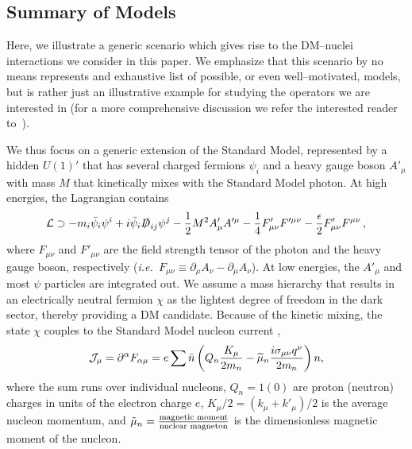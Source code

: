 \documentclass[11pt, a4paper]{article}
\newcommand{\ie}{{\it i.e.~}}  \newcommand{\eg}{{\it e.g.~}}
\newcommand{\pL}{\left(} \newcommand{\pR}{\right)} \newcommand{\bL}{\left[} \newcommand{\bR}{\right]} \newcommand{\cbL}{\left\{} \newcommand{\cbR}{\right\}} \newcommand{\mL}{\left|} \newcommand{\mR}{\right|} \newcommand{\ER}{E_R}
\newcommand{\beq}{\begin{equation}} \newcommand{\eeq}{\end{equation}}
\begin{document}
 
\subsection{Summary of Models}\label{sec:models}

Here, we illustrate a generic scenario which gives rise to the DM--nuclei interactions we consider in this paper. We emphasize that this scenario by no means represents and exhaustive list of possible, or even well--motivated, models, but is rather just an illustrative example for studying the operators we are interested in (for a more comprehensive discussion we refer the interested reader to~\cite{Gresham:2014vja,Gluscevic:2015sqa}). 

We thus focus on a generic extension of the Standard Model, represented by a hidden $U(1)'$ that has several charged fermions $\psi_i$ and a heavy gauge boson $A'_\mu$ with mass $M$ that kinetically mixes with the Standard Model photon. At high energies, the Lagrangian contains
\beq \label{eq:UV-model}
\cL \supset -  m_i \bar{\psi}_i \psi^i + i \bar \psi_i \slashed D_{ij} \psi^j  - \frac12 M^2 A'_\mu A'^\mu  - \frac14 F'_{\mu \nu} F'^{\mu \nu} - \frac\epsilon2 F'_{\mu \nu} F^{\mu \nu} \, ,
\eeq
where $F_{\mu \nu}$ and $F'_{\mu \nu}$ are the field strength tensor of the photon and the heavy gauge boson, respectively (\ie $F_{\mu \nu} \equiv \partial_\mu A_\nu - \partial_\mu A_\nu$). At low energies, the $A'_\mu$ and most $\psi$ particles are integrated out. We assume a mass hierarchy that results in an electrically neutral fermion $\chi$ as the lightest degree of freedom in the dark sector, thereby providing a DM candidate. Because of the kinetic mixing, the state $\chi$ couples to the Standard Model nucleon current \cite{Gresham:2014vja},
\beq \label{eq:current}
\cJ_\mu = \partial^\alpha F_{\alpha \mu} = e \sum \bar n \pL Q_{n} \frac{K_\mu}{2m_{n}} -\widetilde \mu_{n} \frac{i \sigma_{\mu \nu}q^\nu}{2m_n} \pR n,
\eeq 
where the sum runs over individual nucleons, $Q_n=1(0)$ are proton (neutron) charges in units of the electron charge $e$, $K_\mu/2 = (k_\mu + k'_\mu)/2$ is the average nucleon momentum, and $\tilde{\mu}_n = {\text{magnetic moment} \over \text{nuclear magneton}}$ is the dimensionless magnetic moment of the nucleon.
\end{document}
